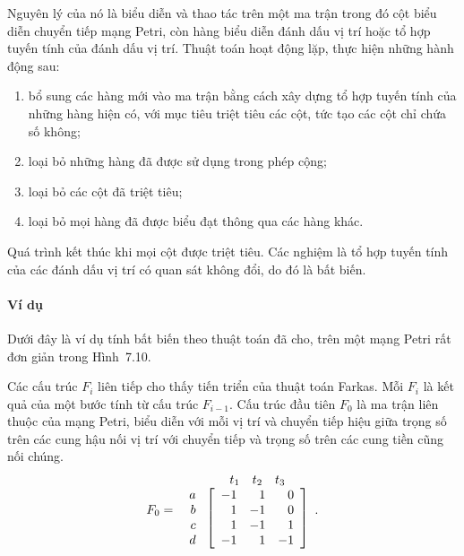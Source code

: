 Nguyên lý của nó là biểu diễn và thao tác trên một ma trận trong đó cột biểu diễn chuyển tiếp mạng Petri, còn hàng biểu diễn đánh dấu vị trí hoặc tổ hợp tuyến tính của đánh dấu vị trí. Thuật toán hoạt động lặp, thực hiện những hành động sau:
\begin{enumerate}
\item bổ sung các hàng mới vào ma trận bằng cách xây dựng tổ hợp tuyến tính của những hàng hiện có, với mục tiêu triệt tiêu các cột, tức tạo các cột chỉ chứa số không;
\item loại bỏ những hàng đã được sử dụng trong phép cộng;
\item loại bỏ các cột đã triệt tiêu;
\item loại bỏ mọi hàng đã được biểu đạt thông qua các hàng khác.
\end{enumerate}
Quá trình kết thúc khi mọi cột được triệt tiêu. Các nghiệm là tổ hợp tuyến tính của các đánh dấu vị trí có quan sát không đổi, do đó là bất biến.

\paragraph{Ví dụ}
Dưới đây là ví dụ tính bất biến theo thuật toán đã cho, trên một mạng Petri rất đơn giản trong Hình~7.10.

Các cấu trúc $F_i$ liên tiếp cho thấy tiến triển của thuật toán Farkas. Mỗi $F_i$ là kết quả của một bước tính từ cấu trúc $F_{i-1}$. Cấu trúc đầu tiên $F_0$ là ma trận liên thuộc của mạng Petri, biểu diễn với mỗi vị trí và chuyển tiếp hiệu giữa trọng số trên các cung hậu nối vị trí với chuyển tiếp và trọng số trên các cung tiền cũng nối chúng.
\[
F_0=
\begin{array}{r@{\ }c}
&\begin{array}{rrr}t_1&t_2&t_3\end{array}\\
\begin{array}{r}a\\b\\c\\d\end{array}&
\left[\begin{array}{rrr}-1&1&0\\1&-1&0\\1&-1&1\\-1&1&-1\end{array}\right]
\end{array}.
\]

